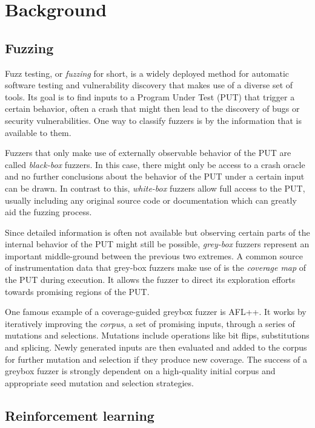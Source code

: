 \section{Background}

\subsection{Fuzzing}

Fuzz testing, or \textit{fuzzing} for short, is a widely deployed method for automatic
software testing and vulnerability discovery that makes use of a diverse set of
tools.\cite{8863940}
Its goal is to find inputs to a Program Under Test (PUT) that trigger a certain
behavior, often a crash that might then lead to the discovery of bugs or security
vulnerabilities.
One way to classify fuzzers is by the information that is available to them.

Fuzzers that only make use of externally observable behavior of the PUT are
called \textit{black-box} fuzzers.
In this case, there might only be access to a crash oracle and no further
conclusions about the behavior of the PUT under a certain input can be drawn.
In contrast to this, \textit{white-box} fuzzers allow full access to the PUT,
usually including any original source code or documentation which can greatly
aid the fuzzing process.

Since detailed information is often not available but observing certain parts
of the internal behavior of the PUT might still be possible, \textit{grey-box}
fuzzers represent an important middle-ground between the previous two extremes.
A common source of instrumentation data that grey-box fuzzers make use of is the
\textit{coverage map} of the PUT during execution.
It allows the fuzzer to direct its exploration efforts towards promising regions of the PUT.


One famous example of a coverage-guided greybox fuzzer is AFL++\cite{fioraldi2020afl++}.
It works by iteratively improving the \textit{corpus}, a set of promising
inputs, through a series of mutations and selections.
Mutations include operations like bit flips, substitutions and splicing.
Newly generated inputs are then evaluated and added to the corpus for further
mutation and selection if they produce new coverage.
The success of a greybox fuzzer is strongly dependent on a high-quality initial
corpus and appropriate seed mutation and selection strategies.

\subsection{Reinforcement learning}

